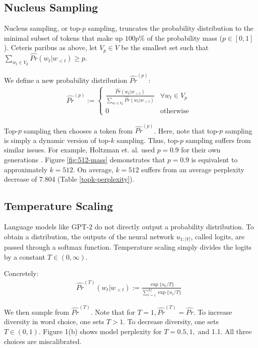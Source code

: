 \documentclass[pageno]{jpaper}
\begin{document}
\subsection{Nucleus Sampling}

Nucleus sampling, or top-$p$ sampling, truncates the probability distribution to the minimal subset of tokens that make up $100p$\% of the probability mass ($p \in [0, 1]$). Ceteris paribus as above, let $V_p \in V$ be the smallest set such that $\sum_{w_t \in V_p} \widehat{Pr}(w_t | w_{<t}) \geq p$. 

We define a new probability distribution $\widehat{Pr}^{(p)}$:
\begin{align*}
    \widehat{Pr}^{(p)} := \begin{cases}
        \frac{\widehat{Pr}(w_t | w_{<t})}{\sum_{w_t \in V_p} \widehat{Pr}(w_t |w_{<t})} & \forall w_t \in V_p \\
        0 & \text{otherwise}
    \end{cases}
\end{align*}

Top-$p$ sampling then chooses a token from $\widehat{Pr}^{(p)}$. Here, note that top-$p$ sampling is simply a dynamic version of top-$k$ sampling. Thus, top-$p$ sampling suffers from similar issues. For example, Holtzman et. al. used $p=0.9$ for their own generations \cite{holtzman2019curious}. Figure \ref{fig:512-mass} demonstrates that $p=0.9$ is equivalent to approximately $k=512$. On average, $k=512$ suffers from an average perplexity decrease of 7.804 (Table \ref{topk-perplexity}).

\subsection{Temperature Scaling}

Language models like GPT-2 do not directly output a probability distribution. To obtain a distribution, the outputs of the neural network $u_{1:|V|}$, called logits, are passed through a softmax function. Temperature scaling simply divides the logits by a constant $T \in (0, \infty)$.

Concretely:
\begin{align*}
    \widehat{Pr}^{(T)}(w_t|w_{<t}) := \frac{\exp \{ u_t / T\}}{\sum_{i = 1}^{|V|} \exp\{u_i / T\}}
\end{align*}

We then sample from $\widehat{Pr}^{(T)}$. Note that for $T=1, \widehat{Pr}^{(T)} = \widehat{Pr}$. To increase diversity in word choice, one sets $T > 1$. To decrease diversity, one sets $T \in (0, 1)$. Figure 1(b) shows model perplexity for $T=0.5, 1,$ and 1.1. All three choices are miscalibrated.
\end{document}
